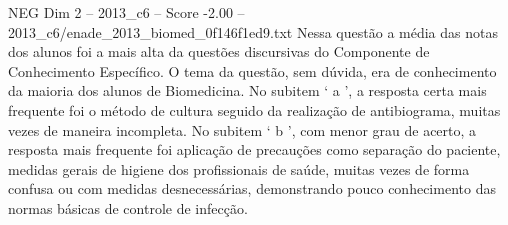 \begin{textsample}{NEG Dim 2 – 2013\_c6 – Score -2.00 – 2013\_c6/enade\_2013\_biomed\_0f146f1ed9.txt}
Nessa questão a média das notas dos alunos foi a mais alta da questões discursivas do Componente de Conhecimento Específico.
O tema da questão, sem dúvida, era de conhecimento da maioria dos alunos de Biomedicina.
No subitem ‘ a ’, a resposta certa mais frequente foi o método de cultura seguido da realização de antibiograma, muitas vezes de maneira incompleta.
No subitem ‘ b ’, com menor grau de acerto, a resposta mais frequente foi aplicação de precauções como separação do paciente, medidas gerais de higiene dos profissionais de saúde, muitas vezes de forma confusa ou com medidas desnecessárias, demonstrando pouco conhecimento das normas básicas de controle de infecção.

\end{textsample}
